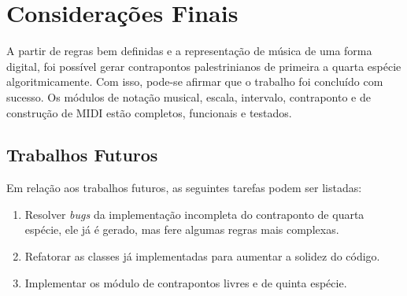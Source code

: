 \chapter[Considerações Finais]{Considerações Finais} \label{c4}

  A partir de regras bem definidas e a representação de música de uma forma digital, foi possível gerar contrapontos palestrinianos de primeira a quarta espécie algoritmicamente. Com isso, pode-se afirmar que o trabalho foi concluído com sucesso. Os módulos de notação musical, escala, intervalo, contraponto e de construção de MIDI estão completos, funcionais e testados.

  \section[Trabalhos Futuros]{Trabalhos Futuros}

    Em relação aos trabalhos futuros, as seguintes tarefas podem ser listadas:

    \begin{enumerate}
      \item Resolver \textit{bugs} da implementação incompleta do contraponto de quarta espécie, ele já é gerado, mas fere algumas regras mais complexas.
      \item Refatorar as classes já implementadas para aumentar a solidez do código.
      \item Implementar os módulo de contrapontos livres e de quinta espécie.
    \end{enumerate}
